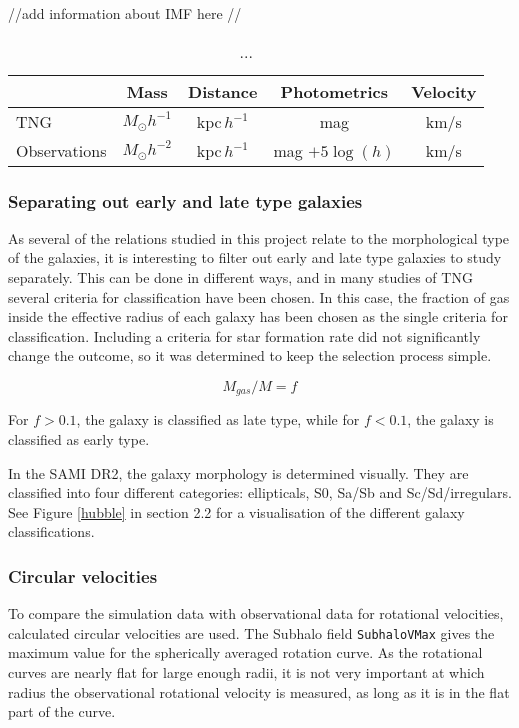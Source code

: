 //add information about IMF here //


\begin{table}
\begin{center}
\begin{tabular}{ l| c c c c } 
 \hline
 \hline
   &  Mass & Distance & Photometrics & Velocity \\
 \hline
 TNG & $M_{\odot}h^{-1}$ & kpc$\,h^{-1}$ & mag & km/s \\ 
 Observations & $M_{\odot}h^{-2}$ & kpc$\,h^{-1}$ & mag $+5\log(h)$ & km/s \\
 \hline 
 \end{tabular}
\end{center}
\caption{...}
 \label{h_dependence}
\end{table}

\subsubsection{Separating out early and late type galaxies}
As several of the relations studied in this project relate to the morphological type of the galaxies, it is interesting to filter out early and late type galaxies to study separately. This can be done in different ways, and in many studies of TNG several criteria for classification have been chosen. In this case, the fraction of gas inside the effective radius of each galaxy has been chosen as the single criteria for classification. Including a criteria for star formation rate did not significantly change the outcome, so it was determined to keep the selection process simple.

\begin{equation}
    M_{gas}/M  = f
\end{equation}

For $f > 0.1$, the galaxy is classified as late type, while for $f< 0.1$, the galaxy is classified as early type.

In the SAMI DR2, the galaxy morphology is determined visually. They are classified into four different categories: ellipticals, S0, Sa/Sb and Sc/Sd/irregulars. See Figure \ref{hubble} in section 2.2 for a visualisation of the different galaxy classifications.

\subsubsection{Circular velocities}
To compare the simulation data with observational data for rotational velocities, calculated circular velocities are used. The Subhalo field \texttt{SubhaloVMax} gives the maximum value for the spherically averaged rotation curve. As the rotational curves are nearly flat for large enough radii, it is not very important at which radius the observational rotational velocity is measured, as long as it is in the flat part of the curve. 

